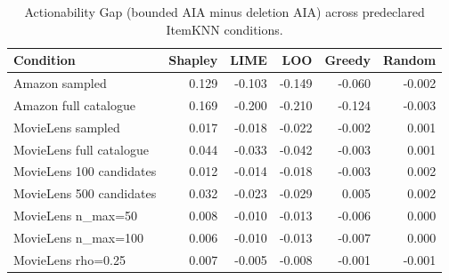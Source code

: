 \begin{table}[t]\centering\scriptsize
\caption{Actionability Gap (bounded AIA minus deletion AIA) across predeclared ItemKNN conditions.}
\label{tab:gap-robustness}
\begin{tabular}{lrrrrr}
\toprule
Condition & Shapley & LIME & LOO & Greedy & Random \\
\midrule
Amazon sampled & 0.129 & -0.103 & -0.149 & -0.060 & -0.002 \\
Amazon full catalogue & 0.169 & -0.200 & -0.210 & -0.124 & -0.003 \\
MovieLens sampled & 0.017 & -0.018 & -0.022 & -0.002 & 0.001 \\
MovieLens full catalogue & 0.044 & -0.033 & -0.042 & -0.003 & 0.001 \\
MovieLens 100 candidates & 0.012 & -0.014 & -0.018 & -0.003 & 0.002 \\
MovieLens 500 candidates & 0.032 & -0.023 & -0.029 & 0.005 & 0.002 \\
MovieLens n_max=50 & 0.008 & -0.010 & -0.013 & -0.006 & 0.000 \\
MovieLens n_max=100 & 0.006 & -0.010 & -0.013 & -0.007 & 0.000 \\
MovieLens rho=0.25 & 0.007 & -0.005 & -0.008 & -0.001 & -0.001 \\
\bottomrule
\end{tabular}
\end{table}
